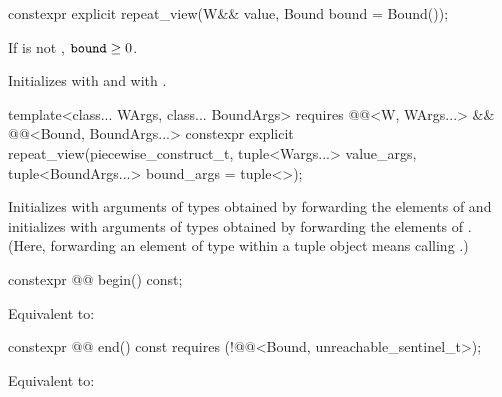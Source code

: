 %
\begin{itemdecl}
constexpr explicit repeat_view(W&& value, Bound bound = Bound());
\end{itemdecl}

\begin{itemdescr}
\pnum
\expects
If  is not , $\texttt{bound} \ge 0$.

\pnum
\effects
Initializes  with  and
 with .
\end{itemdescr}

%
\begin{itemdecl}
template<class... WArgs, class... BoundArgs>
  requires @@<W, WArgs...> &&
           @@<Bound, BoundArgs...>
constexpr explicit repeat_view(piecewise_construct_t,
  tuple<Wargs...> value_args, tuple<BoundArgs...> bound_args = tuple<>{});
\end{itemdecl}

\begin{itemdescr}
\pnum
\effects
Initializes  with arguments of types 
obtained by forwarding the elements of  and
initializes  with arguments of types 
obtained by forwarding the elements of .
(Here, forwarding an element  of type  within a tuple object
means calling .)
\end{itemdescr}

%
\begin{itemdecl}
constexpr @@ begin() const;
\end{itemdecl}

\begin{itemdescr}
\pnum
\effects
Equivalent to: 
\end{itemdescr}

%
\begin{itemdecl}
constexpr @@ end() const requires (!@@<Bound, unreachable_sentinel_t>);
\end{itemdecl}

\begin{itemdescr}
\pnum
\effects
Equivalent to: 
\end{itemdescr}

